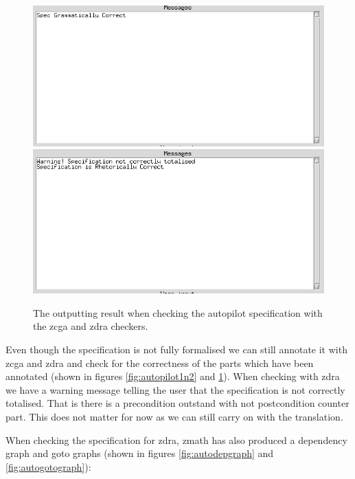 \begin{figure}[H]
\begin{minipage}{0.45\textwidth}
\includegraphics[clip, trim=0cm 8.5cm 9cm 0cm, scale=0.5]{examples/semiform/zcgacorrect.png}
\includegraphics[clip, trim=0cm 8.5cm 9cm 0cm, scale=0.5]{examples/semiform/zdracorrect.png}
\vspace{-0.2in}
\caption{The outputting result when checking the autopilot specification with the \gls{zcga} and \gls{zdra} checkers. \label{fig:autopilotcorrect}}
\vspace{-0.2in}
\end{minipage}
\end{figure}

Even though the specification is not fully formalised we can still annotate it
with \gls{zcga} and \gls{zdra} and check for the correctness of the parts which
have been annotated (shown in figures \ref{fig:autopilot1n2} and
\ref{fig:autopilotcorrect}). When checking with \gls{zdra} we have a warning
message telling the user that the specification is not correctly totalised.
That is there is a precondition outstand with not postcondition counter part.
This does not matter for now as we can still carry on with the translation.

When checking the specification for \gls{zdra}, \gls{zmath} has also produced a
dependency graph and goto graphs (shown in figures \ref{fig:autodepgraph} and
\ref{fig:autogotograph}):

